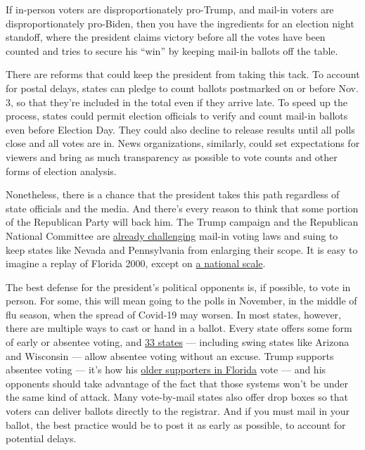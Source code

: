 If in-person voters are disproportionately pro-Trump, and mail-in voters
are disproportionately pro-Biden, then you have the ingredients for an
election night standoff, where the president claims victory before all
the votes have been counted and tries to secure his ``win'' by keeping
mail-in ballots off the table.

There are reforms that could keep the president from taking this tack.
To account for postal delays, states can pledge to count ballots
postmarked on or before Nov. 3, so that they're included in the total
even if they arrive late. To speed up the process, states could permit
election officials to verify and count mail-in ballots even before
Election Day. They could also decline to release results until all polls
close and all votes are in. News organizations, similarly, could set
expectations for viewers and bring as much transparency as possible to
vote counts and other forms of election analysis.

Nonetheless, there is a chance that the president takes this path
regardless of state officials and the media. And there's every reason to
think that some portion of the Republican Party will back him. The Trump
campaign and the Republican National Committee are
\href{https://www.cnn.com/2020/08/01/politics/donald-trump-election-voting/index.html}{already
challenging} mail-in voting laws and suing to keep states like Nevada
and Pennsylvania from enlarging their scope. It is easy to imagine a
replay of Florida 2000, except on
\href{https://www.nytimes3xbfgragh.onion/2020/08/08/us/politics/voting-nov-3-election.html}{a
national scale}.

The best defense for the president's political opponents is, if
possible, to vote in person. For some, this will mean going to the polls
in November, in the middle of flu season, when the spread of Covid-19
may worsen. In most states, however, there are multiple ways to cast or
hand in a ballot. Every state offers some form of early or absentee
voting, and
\href{https://bipartisanpolicy.org/blog/voting-in-the-time-of-corona-the-difference-between-absentee-voting-and-voting-by-mail/}{33
states} --- including swing states like Arizona and Wisconsin --- allow
absentee voting without an excuse. Trump supports absentee voting ---
it's how his
\href{https://apnews.com/19ade6dafb5b6f82f324e4be9b12a7a0}{older
supporters in Florida} vote --- and his opponents should take advantage
of the fact that those systems won't be under the same kind of attack.
Many vote-by-mail states also offer drop boxes so that voters can
deliver ballots directly to the registrar. And if you must mail in your
ballot, the best practice would be to post it as early as possible, to
account for potential delays.


